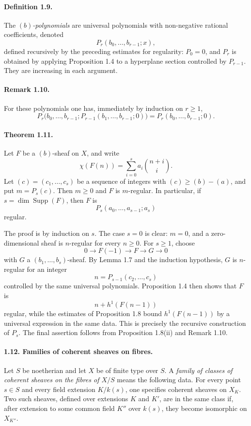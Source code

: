 \documentclass[12pt]{article}
\begin{document}
\paragraph{Definition 1.9.}
The \emph{$(b)$-polynomials} are universal polynomials with non-negative rational coefficients, denoted
\[
P_r(b_0,\ldots,b_{r-1};x),
\]
defined recursively by the preceding estimates for regularity: $P_0=0$, and $P_r$ is obtained by applying Proposition 1.4 to a hyperplane section controlled by $P_{r-1}$. They are increasing in each argument.

\paragraph{Remark 1.10.}
For these polynomials one has, immediately by induction on $r\geq1$,
\[
P_r\bigl(b_0,\ldots,b_{r-1};P_{r-1}(b_1,\ldots,b_{r-1};0)\bigr)
 =P_r(b_0,\ldots,b_{r-1};0).
\]

\paragraph{Theorem 1.11.}
Let $F$ be a $(b)$-sheaf on $X$, and write
\[
\chi(F(n))=\sum_{i=0}^s a_i\binom{n+i}{i}.
\]
Let $(c)=(c_1,\ldots,c_s)$ be a sequence of integers with $(c)\geq (b)-(a)$, and put $m=P_s(c)$. Then $m\geq0$ and $F$ is $m$-regular. In particular, if $s=\dim\operatorname{Supp}(F)$, then $F$ is
\[
P_s(a_0,\ldots,a_{s-1};a_s)
\]
regular.

The proof is by induction on $s$. The case $s=0$ is clear: $m=0$, and a zero-dimensional sheaf is $n$-regular for every $n\geq0$. For $s\geq1$, choose
\[
0\to F(-1)\to F\to G\to0
\]
with $G$ a $(b_1,\ldots,b_s)$-sheaf. By Lemma 1.7 and the induction hypothesis, $G$ is $n$-regular for an integer
\[
n=P_{s-1}(c_2,\ldots,c_s)
\]
controlled by the same universal polynomials. Proposition 1.4 then shows that $F$ is
\[
n+h^1(F(n-1))
\]
regular, while the estimates of Proposition 1.8 bound $h^1(F(n-1))$ by a universal expression in the same data. This is precisely the recursive construction of $P_s$. The final assertion follows from Proposition 1.8(ii) and Remark 1.10.

\paragraph{1.12. Families of coherent sheaves on fibres.}
Let $S$ be noetherian and let $X$ be of finite type over $S$. A \emph{family of classes of coherent sheaves on the fibres of $X/S$} means the following data. For every point $s\in S$ and every field extension $K/k(s)$, one specifies coherent sheaves on $X_K$. Two such sheaves, defined over extensions $K$ and $K'$, are in the same class if, after extension to some common field $K''$ over $k(s)$, they become isomorphic on $X_{K''}$.
\end{document}
